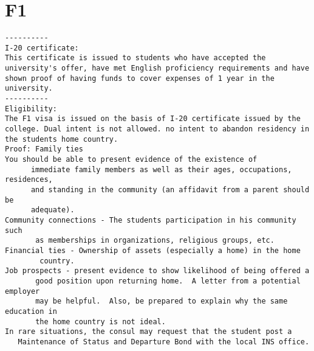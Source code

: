 \documentclass[oneside, article]{memoir}
\begin{document}
\section{F1}
\begin{verbatim}
----------
I-20 certificate:
This certificate is issued to students who have accepted the university's offer, have met English proficiency requirements and have shown proof of having funds to cover expenses of 1 year in the university.
----------
Eligibility:
The F1 visa is issued on the basis of I-20 certificate issued by the college. Dual intent is not allowed. no intent to abandon residency in the students home country.
Proof: Family ties
You should be able to present evidence of the existence of
      immediate family members as well as their ages, occupations, residences,
      and standing in the community (an affidavit from a parent should be
      adequate).
Community connections - The students participation in his community such
       as memberships in organizations, religious groups, etc.
Financial ties - Ownership of assets (especially a home) in the home
        country.
Job prospects - present evidence to show likelihood of being offered a
       good position upon returning home.  A letter from a potential employer
       may be helpful.  Also, be prepared to explain why the same education in
       the home country is not ideal.
In rare situations, the consul may request that the student post a
   Maintenance of Status and Departure Bond with the local INS office.


\end{verbatim}
\end{document}
